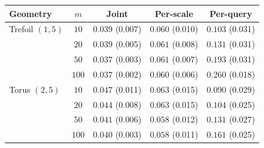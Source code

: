 \begin{tabular}{lcccc}
\toprule
Geometry & $m$ & Joint & Per-scale & Per-query \\
\midrule
Trefoil $(1,5)$ & $10$ & $0.039$ \scriptsize(0.007) & $0.060$ \scriptsize(0.010) & $0.103$ \scriptsize(0.031) \\
 & $20$ & $0.039$ \scriptsize(0.005) & $0.061$ \scriptsize(0.008) & $0.131$ \scriptsize(0.031) \\
 & $50$ & $0.037$ \scriptsize(0.003) & $0.061$ \scriptsize(0.007) & $0.193$ \scriptsize(0.031) \\
 & $100$ & $0.037$ \scriptsize(0.002) & $0.060$ \scriptsize(0.006) & $0.260$ \scriptsize(0.018) \\
\midrule
Torus $(2,5)$ & $10$ & $0.047$ \scriptsize(0.011) & $0.063$ \scriptsize(0.015) & $0.090$ \scriptsize(0.029) \\
 & $20$ & $0.044$ \scriptsize(0.008) & $0.063$ \scriptsize(0.015) & $0.104$ \scriptsize(0.025) \\
 & $50$ & $0.041$ \scriptsize(0.006) & $0.058$ \scriptsize(0.012) & $0.131$ \scriptsize(0.027) \\
 & $100$ & $0.040$ \scriptsize(0.003) & $0.058$ \scriptsize(0.011) & $0.161$ \scriptsize(0.025) \\
\bottomrule
\end{tabular}
